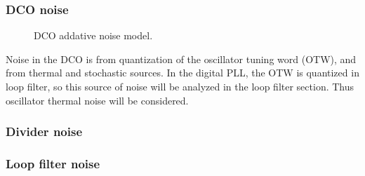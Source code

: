 \subsubsection{DCO noise}
\begin{figure}[htb!]
	\center
	\caption{DCO addative noise model.}
	\label{fig:quantization}
\end{figure}
\FloatBarrier
Noise in the DCO is from quantization of the oscillator tuning word (OTW), and from thermal and stochastic sources. In the digital PLL, the OTW is quantized in loop filter, so this source of noise will be analyzed in the loop filter section. Thus oscillator thermal noise will be considered.
\subsubsection{Divider noise}

\subsubsection{Loop filter noise}

